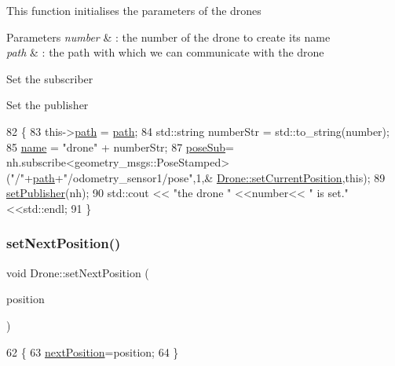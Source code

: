 This function initialises the parameters of the drones 
\begin{DoxyParams}{Parameters}
{\em number} & \+: the number of the drone to create its name \\
\hline
{\em path} & \+: the path with which we can communicate with the drone \\
\hline
\end{DoxyParams}
Set the subscriber

Set the publisher 
\begin{DoxyCode}
82 \{
83     this->\hyperlink{classDrone_a19bf0a73d086997ba0589984c58b62da}{path} = \hyperlink{classDrone_a19bf0a73d086997ba0589984c58b62da}{path};
84     std::string numberStr = std::to\_string(number);
85     \hyperlink{classDrone_ac5f6c269378659247acd057142542013}{name} = \textcolor{stringliteral}{"drone"} + numberStr;
87     \hyperlink{classDrone_a8baae58c4cbe6f1a8d239fca2d3496d6}{poseSub}= nh.subscribe<geometry\_msgs::PoseStamped>(\textcolor{stringliteral}{"/"}+\hyperlink{classDrone_a19bf0a73d086997ba0589984c58b62da}{path}+\textcolor{stringliteral}{"/odometry\_sensor1/pose"},1,&
      \hyperlink{classDrone_a16ee9c16220886633f98e591c9e3dac5}{Drone::setCurrentPosition},\textcolor{keyword}{this});
89     \hyperlink{classDrone_a8d6917c3191ec7f675b246895ffa6a0d}{setPublisher}(nh);
90     std::cout << \textcolor{stringliteral}{"the drone "} <<number<< \textcolor{stringliteral}{" is set."}<<std::endl;
91 \}
\end{DoxyCode}
\mbox{\label{classDrone_a9addfdac3dc0e676ba12c1f4ced68fbe}} 
\subsubsection{\texorpdfstring{set\+Next\+Position()}{setNextPosition()}\hspace{0.1cm}{\footnotesize\ttfamily [1/2]}}
{\footnotesize\ttfamily void Drone\+::set\+Next\+Position (\begin{DoxyParamCaption}\item[{geometry\+\_\+msgs\+::\+Pose\+Stamped}]{position }\end{DoxyParamCaption})}


\begin{DoxyCode}
62 \{
63     \hyperlink{classDrone_a49f95c0480f27c22c122f5bb8482e914}{nextPosition}=position;
64 \}
\end{DoxyCode}
\mbox{\label{classDrone_a9addfdac3dc0e676ba12c1f4ced68fbe}} 
